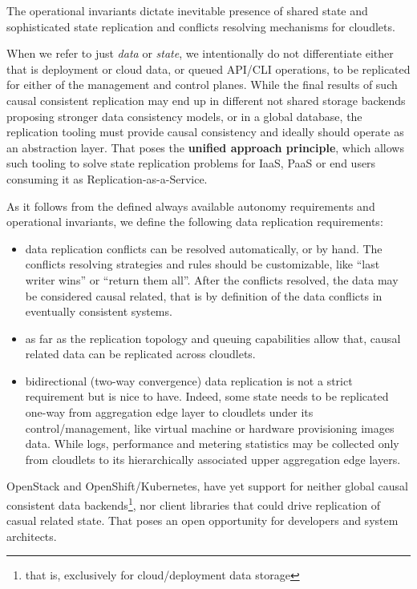 \documentclass[conference]{IEEEtran}
\begin{document}
The operational invariants dictate inevitable presence of shared state and
sophisticated state replication and conflicts resolving
mechanisms for cloudlets.

When we refer to just \textit{data} or \textit{state}, we intentionally do not
differentiate either that is deployment or cloud data, or queued API/CLI
operations, to be replicated for either of the management and control planes.
While the final results of such causal consistent replication may end up in
different not shared storage backends proposing stronger data consistency
models, or in a global database, the replication tooling must provide causal
consistency and ideally should operate as an abstraction layer. That poses the
\textbf{unified approach principle}, which allows such tooling to solve state
replication problems for IaaS, PaaS or end users consuming it as
Replication-as-a-Service.

As it follows from the defined always available autonomy requirements and
operational invariants, we define the following data replication requirements:

\begin{itemize}
  \item data replication conflicts can be resolved automatically, or by hand.
    The conflicts resolving strategies and rules should be customizable, like
    ``last writer wins'' or ``return them all''. After the conflicts resolved,
    the data may be considered causal related, that is by definition\cite{b1}
    of the data conflicts in eventually consistent systems.
  \item as far as the replication topology and queuing capabilities allow
    that, causal related data can be replicated across cloudlets.
  \item bidirectional (two-way convergence) data replication is not a strict
    requirement but is nice to have. Indeed, some state needs to be replicated
    one-way from aggregation edge layer to cloudlets under its
    control/management, like virtual machine or hardware provisioning images
    data. While logs, performance and metering statistics may be collected only
    from cloudlets to its hierarchically associated upper aggregation edge
    layers.
\end{itemize}

OpenStack and OpenShift/Kubernetes, have yet support for neither global causal
consistent data backends\footnote{that is, exclusively for cloud/deployment
data storage}, nor client libraries that could drive replication of casual
related state. That poses an open opportunity for developers and system
architects.
\end{document}
